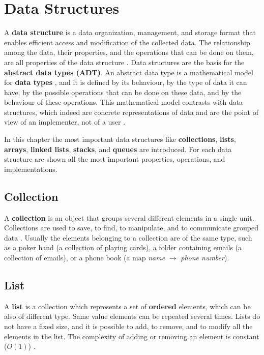 \chapter{Data Structures}
\label{chp:datastrucutres}
A \textbf{data structure} is a data organization, management, and storage format that enables efficient access and modification of the collected data. The relationship among the data, their properties, and the operations that can be done on them, are all properties of the data structure \cite{wikidatastructure}. Data structures are the basis for the \textbf{abstract data types (ADT)}. An abstract data type is a mathematical model for \textbf{data types} \cite{wikidatatype}, and it is defined by its behaviour, by the type of data it can have, by the possible operations that can be done on these data, and by the behaviour of these operations. This mathematical model contrasts with data structures, which indeed are concrete representations of data and are the point of view of an implementer, not of a user \cite{wikiabstractdatatype}.

In this chapter the most important data structures like \textbf{collections}, \textbf{lists}, \textbf{arrays}, \textbf{linked lists}, \textbf{stacks}, and \textbf{queues} are introduced. For each data structure are shown all the most important properties, operations, and implementations.

\section{Collection}
A \textbf{collection} is an object that groups several different elements in a single unit. Collections are used to save, to find, to manipulate, and to communicate grouped data \cite{wikicollection}. Usually the elements belonging to a collection are of the same type, such as a poker hand (a collection of playing cards), a folder containing emails (a collection of emails), or a phone book (a map \textit{name} \(\rightarrow\) \textit{phone number}).

\section{List}
A \textbf{list} is a collection which represents a set of \textbf{ordered} elements, which can be also of different type. Same value elements can be repeated several times. Lists do not have a fixed size, and it is possible to add, to remove, and to modify all the elements in the list. The complexity of adding or removing an element is constant (\(O(1)\)) \cite{wikilist}.

